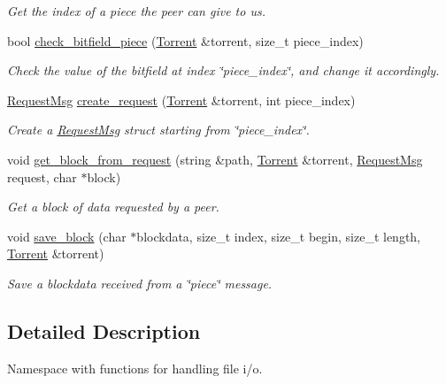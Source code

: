 \begin{DoxyCompactItemize}
\begin{DoxyCompactList}\small\item\em Get the index of a piece the peer can give to us. \end{DoxyCompactList}\item 
bool \hyperlink{namespacefileio_ae56e407c834f29cd78eb144cb754a8f5}{check\+\_\+bitfield\+\_\+piece} (\hyperlink{structtorr_1_1Torrent}{Torrent} \&torrent, size\+\_\+t piece\+\_\+index)
\begin{DoxyCompactList}\small\item\em Check the value of the bitfield at index \char`\"{}piece\+\_\+index\char`\"{}, and change it accordingly. \end{DoxyCompactList}\item 
\hyperlink{structfileio_1_1RequestMsg}{Request\+Msg} \hyperlink{namespacefileio_a6c26bf16806ad09920392d80ca362a5b}{create\+\_\+request} (\hyperlink{structtorr_1_1Torrent}{Torrent} \&torrent, int piece\+\_\+index)
\begin{DoxyCompactList}\small\item\em Create a \hyperlink{structfileio_1_1RequestMsg}{Request\+Msg} struct starting from \char`\"{}piece\+\_\+index\char`\"{}. \end{DoxyCompactList}\item 
void \hyperlink{namespacefileio_a8bc5078bab6b41e8bce7cdd7193c1ff5}{get\+\_\+block\+\_\+from\+\_\+request} (string \&path, \hyperlink{structtorr_1_1Torrent}{Torrent} \&torrent, \hyperlink{structfileio_1_1RequestMsg}{Request\+Msg} request, char $\ast$block)
\begin{DoxyCompactList}\small\item\em Get a block of data requested by a peer. \end{DoxyCompactList}\item 
void \hyperlink{namespacefileio_acc37418d350d6d36c3f691c99de9cf39}{save\+\_\+block} (char $\ast$blockdata, size\+\_\+t index, size\+\_\+t begin, size\+\_\+t length, \hyperlink{structtorr_1_1Torrent}{Torrent} \&torrent)
\begin{DoxyCompactList}\small\item\em Save a blockdata received from a \char`\"{}piece\char`\"{} message. \end{DoxyCompactList}\end{DoxyCompactItemize}


\subsection{Detailed Description}
Namespace with functions for handling file i/o. 

